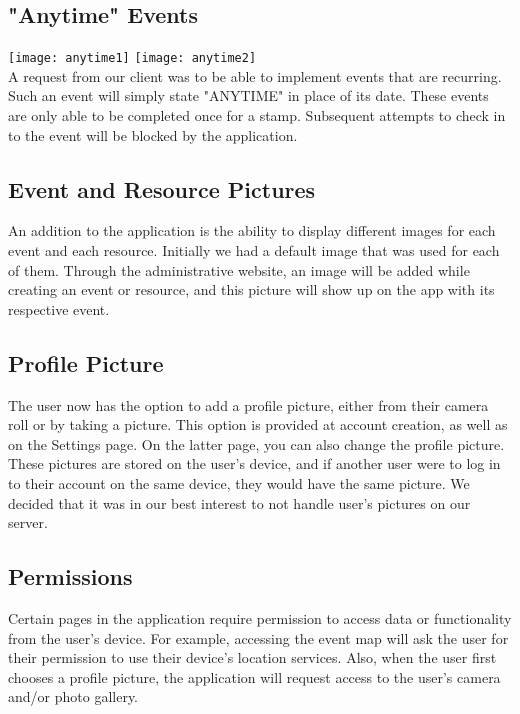 \documentclass[onecolumn, draftclsnofoot,10pt, compsoc]{IEEEtran}
\begin{document}
  \subsection{"Anytime" Events}
    \texttt{[image: anytime1]}
    \texttt{[image: anytime2]} \\
    A request from our client was to be able to implement events that are recurring. Such an event will simply state "ANYTIME" in place of its date. These events are only
    able to be completed once for a stamp. Subsequent attempts to check in to the event will be blocked by the application.

  \subsection{Event and Resource Pictures}
    An addition to the application is the ability to display different images for each event and each resource. Initially we had a default image that was used for each of them.
    Through the administrative website, an image will be added while creating an event or resource, and this picture will show up on the app with its respective event.

  \subsection{Profile Picture}
    The user now has the option to add a profile picture, either from their camera roll or by taking a picture. This option is provided at account creation, as well as on the Settings
    page. On the latter page, you can also change the profile picture. These pictures are stored on the user's device, and if another user were to log in to their account on the
    same device, they would have the same picture. We decided that it was in our best interest to not handle user's pictures on our server.

  \subsection{Permissions}
    Certain pages in the application require permission to access data or functionality from the user's device. For example, accessing the event map will ask the user for their
    permission to use their device's location services. Also, when the user first chooses a profile picture, the application will request access to the user's camera and/or photo gallery.
\end{document}
